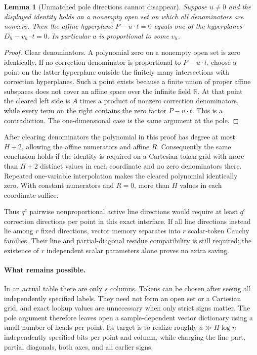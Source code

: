 \documentclass[11pt]{article}
\newtheorem{lemma}{Lemma}
\begin{document}
\begin{lemma}[Unmatched pole directions cannot disappear]
Suppose $u\ne0$ and the displayed identity holds on a nonempty open set on which all
denominators are nonzero. Then the affine hyperplane
$P-u\cdot t=0$ equals one of the hyperplanes $D_h-v_h\cdot t=0$.
In particular $u$ is proportional to some $v_h$.
\end{lemma}
\begin{proof}
Clear denominators. A polynomial zero on a nonempty open set is zero
identically. If no correction denominator is proportional to $P-u\cdot t$,
choose a point on the latter hyperplane outside the finitely many
intersections with correction hyperplanes. Such a point exists because a
finite union of proper affine subspaces does not cover an affine space
over the infinite field $\mathbb R$. At that point the cleared left side
is $A$ times a product of nonzero correction denominators, while every
term on the right contains the zero factor $P-u\cdot t$. This is a
contradiction. The one-dimensional case is the same argument at the pole.
\end{proof}

After clearing denominators the polynomial in this proof has degree at
most $H+2$, allowing the affine numerators and affine $R$. Consequently
the same conclusion holds if the identity is required on a Cartesian
token grid with more than $H+2$ distinct values in each coordinate and no
zero denominators there. Repeated one-variable interpolation makes the
cleared polynomial identically zero. With constant numerators and $R=0$,
more than $H$ values in each coordinate suffice.

Thus $q^c$ pairwise nonproportional active line directions would require
at least $q^c$ correction directions per point in this exact interface.
If all line directions instead lie among $r$ fixed directions, vector
memory separates into $r$ scalar-token Cauchy families. Their line and
partial-diagonal residue compatibility is still required; the existence
of $r$ independent scalar parameters alone proves no extra saving.

\paragraph{What remains possible.}
In an actual table there are only $s$ columns. Tokens can be chosen after
seeing all independently specified labels. They need not form an open set
or a Cartesian grid, and exact lookup values are unnecessary when only
strict signs matter. The pole argument therefore leaves open a
sample-dependent vector dictionary using a small number of heads per
point. Its target is to realize roughly $a\gg H\log n$ independently
specified bits per point and column, while charging the line part,
partial diagonals, both axes, and all earlier signs.
\end{document}
